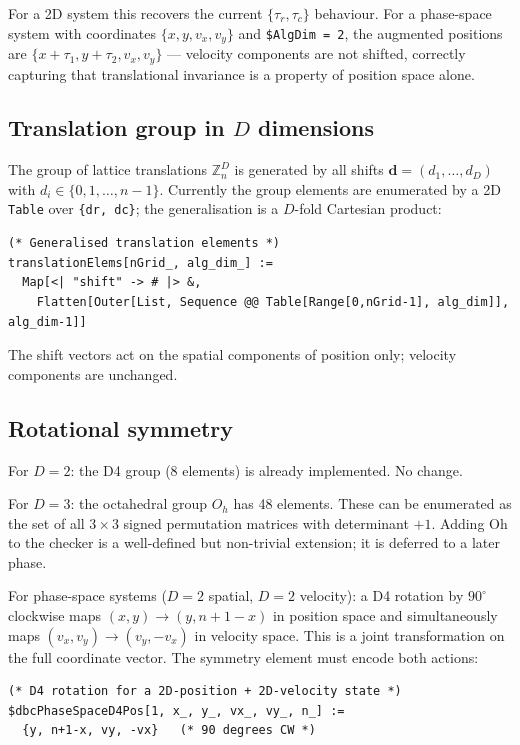 \documentclass[12pt,a4paper]{article}
\begin{document}
For a 2D system this recovers the current $\{\tau_r, \tau_c\}$ behaviour.  For
a phase-space system with coordinates $\{x, y, v_x, v_y\}$ and
\texttt{\$AlgDim = 2}, the augmented positions are $\{x + \tau_1, y + \tau_2,
v_x, v_y\}$ --- velocity components are not shifted, correctly capturing that
translational invariance is a property of position space alone.

\subsection{Translation group in \texorpdfstring{$D$}{D} dimensions}

The group of lattice translations $\mathbb{Z}_n^D$ is generated by all shifts
$\mathbf{d} = (d_1, \ldots, d_D)$ with $d_i \in \{0, 1, \ldots, n-1\}$.
Currently the group elements are enumerated by a 2D \texttt{Table} over
\texttt{\{dr, dc\}}; the generalisation is a $D$-fold Cartesian product:

\begin{lstlisting}
(* Generalised translation elements *)
translationElems[nGrid_, alg_dim_] :=
  Map[<| "shift" -> # |> &,
    Flatten[Outer[List, Sequence @@ Table[Range[0,nGrid-1], alg_dim]], alg_dim-1]]
\end{lstlisting}

The shift vectors act on the spatial components of position only; velocity
components are unchanged.

\subsection{Rotational symmetry}

For $D = 2$: the D4 group (8 elements) is already implemented.  No change.

For $D = 3$: the octahedral group $O_h$ has 48 elements.  These can be
enumerated as the set of all $3\times3$ signed permutation matrices with
determinant $+1$.  Adding Oh to the checker is a well-defined but non-trivial
extension; it is deferred to a later phase.

For phase-space systems ($D = 2$ spatial, $D = 2$ velocity): a D4 rotation by
$90^\circ$ clockwise maps $(x, y) \to (y, n+1-x)$ in position space and
simultaneously maps $(v_x, v_y) \to (v_y, -v_x)$ in velocity space.  This is
a joint transformation on the full coordinate vector.  The symmetry element
must encode both actions:

\begin{lstlisting}
(* D4 rotation for a 2D-position + 2D-velocity state *)
$dbcPhaseSpaceD4Pos[1, x_, y_, vx_, vy_, n_] :=
  {y, n+1-x, vy, -vx}   (* 90 degrees CW *)
\end{lstlisting}
\end{document}
